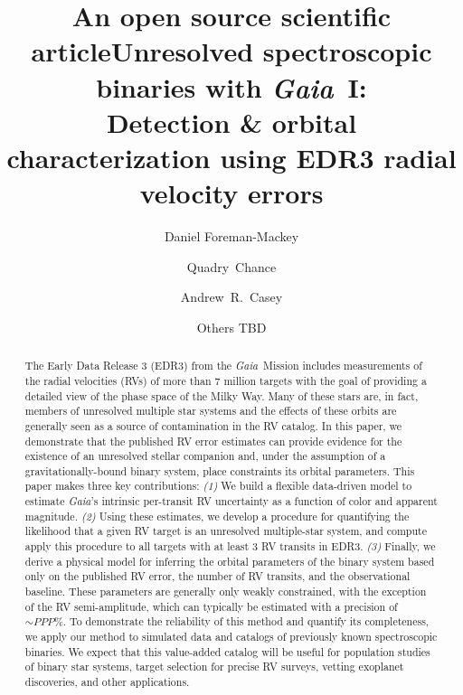 \documentclass[modern, letterpaper]{aastex631}
\newcommand{\project}[1]{\textsl{#1}}
\newcommand{\Gaia}{\project{Gaia}}
\begin{document}
\title{An open source scientific article}

\title{Unresolved spectroscopic binaries with \Gaia\ I: \\
	Detection \& orbital characterization using EDR3 radial velocity errors}


\author[0000-0002-9328-5652]{Daniel Foreman-Mackey}

\author{Quadry~Chance}

\author{Andrew~R.~Casey}

\author{Others TBD}
\noaffiliation{}

\begin{abstract}
	The Early Data Release 3 (EDR3) from the \Gaia\ Mission includes measurements of the radial velocities (RVs) of more than 7 million targets with the goal of providing a detailed view of the phase space of the Milky Way.
	Many of these stars are, in fact, members of unresolved multiple star systems and the effects of these orbits are generally seen as a source of contamination in the RV catalog.
	In this paper, we demonstrate that the published RV error estimates can provide evidence for the existence of an unresolved stellar companion and, under the assumption of a gravitationally-bound binary system, place constraints its orbital parameters.
	This paper makes three key contributions:
	\emph{(1)} We build a flexible data-driven model to estimate \Gaia's intrinsic per-transit RV uncertainty as a function of color and apparent magnitude.
	\emph{(2)} Using these estimates, we develop a procedure for quantifying the likelihood that a given RV target is an unresolved multiple-star system, and compute apply this procedure to all targets with at least 3 RV transits in EDR3.
	\emph{(3)} Finally, we derive a physical model for inferring the orbital parameters of the binary system based only on the published RV error, the number of RV transits, and the observational baseline.
	These parameters are generally only weakly constrained, with the exception of the RV semi-amplitude, which can typically be estimated with a precision of $\sim PPP\%$.
	To demonstrate the reliability of this method and quantify its completeness, we apply our method to simulated data and catalogs of previously known spectroscopic binaries.
	We expect that this value-added catalog will be useful for population studies of binary star systems, target selection for precise RV surveys, vetting exoplanet discoveries, and other applications.
\end{abstract}
\end{document}
